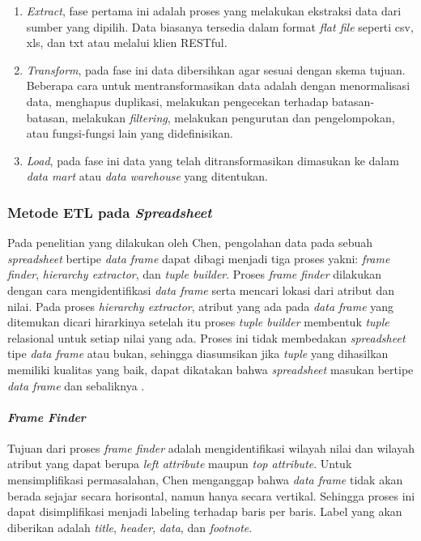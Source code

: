 \begin{enumerate}
    \item \textit{Extract}, fase pertama ini adalah proses yang melakukan ekstraksi data dari sumber yang dipilih. Data biasanya tersedia dalam format \textit{flat file} seperti csv, xls, dan txt atau melalui klien RESTful.
    \item \textit{Transform}, pada fase ini data dibersihkan agar sesuai dengan skema tujuan. Beberapa cara untuk mentransformasikan data adalah dengan menormalisasi data, menghapus duplikasi, melakukan pengecekan terhadap batasan-batasan, melakukan \textit{filtering}, melakukan pengurutan dan pengelompokan, atau fungsi-fungsi lain yang didefinisikan.
    \item \textit{Load}, pada fase ini data yang telah ditransformasikan dimasukan ke dalam \textit{data mart} atau \textit{data warehouse} yang ditentukan.
\end{enumerate}

\subsubsection{Metode ETL pada \textit{Spreadsheet}} \label{metodepencarian}
Pada penelitian yang dilakukan oleh Chen, pengolahan data pada sebuah \textit{spreadsheet} bertipe \textit{data frame} dapat dibagi menjadi tiga proses yakni: \textit{frame finder}, \textit{hierarchy extractor}, dan \textit{tuple builder}. Proses \textit{frame finder} dilakukan dengan cara mengidentifikasi \textit{data frame} serta mencari lokasi dari atribut dan nilai. Pada proses \textit{hierarchy extractor}, atribut yang ada pada \textit{data frame} yang ditemukan dicari hirarkinya setelah itu proses \textit{tuple builder} membentuk \textit{tuple} relasional untuk setiap nilai yang ada. Proses ini tidak membedakan \textit{spreadsheet} tipe \textit{data frame} atau bukan, sehingga diasumsikan jika \textit{tuple} yang dihasilkan memiliki kualitas yang baik, dapat dikatakan bahwa \textit{spreadsheet} masukan bertipe \textit{data frame} dan sebaliknya \citep{Chen2013}.

\paragraph{\textit{Frame Finder}}
Tujuan dari proses \textit{frame finder} \citep{Chen2013} adalah mengidentifikasi wilayah nilai dan wilayah atribut yang dapat berupa \textit{left attribute} maupun \textit{top attribute}. Untuk mensimplifikasi permasalahan, Chen menganggap bahwa \textit{data frame} tidak akan berada sejajar secara horisontal, namun hanya secara vertikal. Sehingga proses ini dapat disimplifikasi menjadi labeling terhadap baris per baris. Label yang akan diberikan adalah \textit{title}, \textit{header}, \textit{data}, dan \textit{footnote}.

